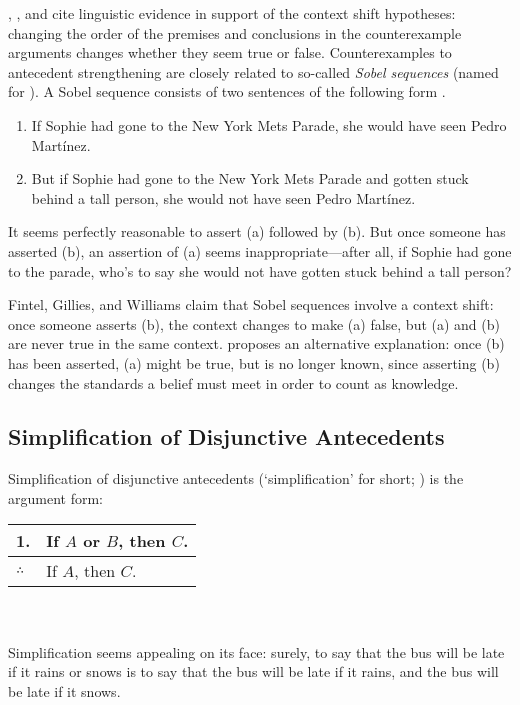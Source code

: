 \citet{fintel-dynamic}, \citet{Gillies2007-GILCS}, and \citet{Williams2008-WILCAC-2} cite linguistic evidence in support of the context shift hypotheses: changing the order of the premises and conclusions in the counterexample arguments changes whether they seem true or false. Counterexamples to antecedent strengthening are closely related to so-called \emph{Sobel sequences} (named for \citealt{Sobel1970-SOBUSA}).  A Sobel sequence consists of two sentences of the following form \citep{Gillies2007-GILCS}.
\begin{enumerate}
\renewcommand{\labelenumi}{(\alph{enumi})}
\item If Sophie had gone to the New York Mets Parade, she would have seen Pedro Mart\'inez.
\item But if Sophie had gone to the New York Mets Parade and gotten stuck behind a tall person, she would not have seen Pedro Mart\'inez.
\end{enumerate}
It seems perfectly reasonable to assert (a) followed by (b).  But once someone has asserted (b), an assertion of (a) seems inappropriate---after all, if Sophie had gone to the parade, who's to say she would not have gotten stuck behind a tall person?

Fintel, Gillies, and Williams claim that Sobel sequences involve a context shift: once someone asserts (b), the context changes to make (a) false, but (a) and (b) are never true in the same context.   \citet{Moss2012-MOSOTP} proposes an alternative explanation: once (b) has been asserted, (a) might be true, but is no longer known, since asserting (b) changes the standards a belief must meet in order to count as knowledge.

\subsection{Simplification of Disjunctive Antecedents}

Simplification of disjunctive antecedents (`simplification' for short; \citealp{Nute1975-NUTCAT-2}) is the argument form:\smallskip\\
\begin{tabular}{ll}
1. & If $A$ or $B$, then $C$.\\
\hline
$\therefore$ & If $A$, then $C$.
\end{tabular}\\\smallskip\\
Simplification seems appealing on its face: surely, to say that the bus will be late if it rains or snows is to say that the bus will be late if it rains, and the bus will be late if it snows.

